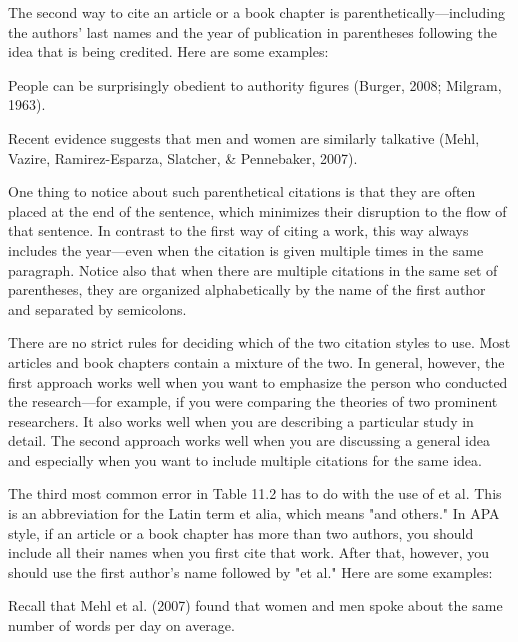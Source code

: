 The second way to cite an article or a book chapter is parenthetically---including the authors' last names and the year of publication in parentheses following the idea that is being credited. Here are some examples:


\begin{kframe}
People can be surprisingly obedient to authority figures (Burger, 2008; Milgram, 1963).

\end{kframe}

\begin{kframe}
Recent evidence suggests that men and women are similarly talkative (Mehl, Vazire, Ramirez-Esparza, Slatcher, \& Pennebaker, 2007).

\end{kframe}

One thing to notice about such parenthetical citations is that they are often placed at the end of the sentence, which minimizes their disruption to the flow of that sentence. In contrast to the first way of citing a work, this way always includes the year---even when the citation is given multiple times in the same paragraph. Notice also that when there are multiple citations in the same set of parentheses, they are organized alphabetically by the name of the first author and separated by semicolons.

There are no strict rules for deciding which of the two citation styles to use. Most articles and book chapters contain a mixture of the two. In general, however, the first approach works well when you want to emphasize the person who conducted the research---for example, if you were comparing the theories of two prominent researchers. It also works well when you are describing a particular study in detail. The second approach works well when you are discussing a general idea and especially when you want to include multiple citations for the same idea.

The third most common error in Table 11.2 has to do with the use of et al. This is an abbreviation for the Latin term et alia, which means "and others." In APA style, if an article or a book chapter has more than two authors, you should include all their names when you first cite that work. After that, however, you should use the first author's name followed by "et al." Here are some examples:

\begin{kframe}
Recall that Mehl et al. (2007) found that women and men spoke about the same number of words per day on average.
\end{kframe}

